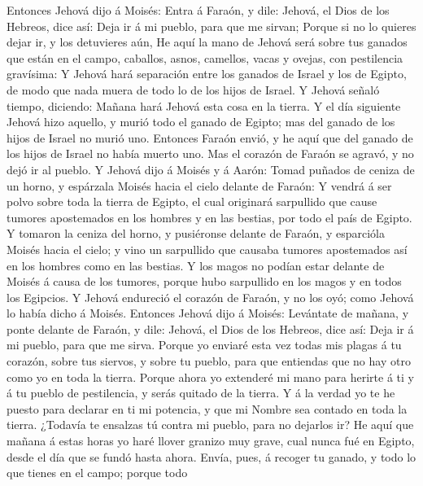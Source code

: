  Entonces Jehová dijo á Moisés: Entra á Faraón, y dile:
Jehová, el Dios de los Hebreos, dice así: Deja ir á mi pueblo, para que
me sirvan;  Porque si no lo quieres dejar ir, y los
detuvieres aún,  He aquí la mano de Jehová será sobre tus
ganados que están en el campo, caballos, asnos, camellos, vacas y
ovejas, con pestilencia gravísima:  Y Jehová hará
separación entre los ganados de Israel y los de Egipto, de modo que nada
muera de todo lo de los hijos de Israel.  Y Jehová señaló
tiempo, diciendo: Mañana hará Jehová esta cosa en la tierra.
 Y el día siguiente Jehová hizo aquello, y murió todo el
ganado de Egipto; mas del ganado de los hijos de Israel no murió uno.
 Entonces Faraón envió, y he aquí que del ganado de los
hijos de Israel no había muerto uno. Mas el corazón de Faraón se agravó,
y no dejó ir al pueblo.  Y Jehová dijo á Moisés y á Aarón:
Tomad puñados de ceniza de un horno, y espárzala Moisés hacia el cielo
delante de Faraón:  Y vendrá á ser polvo sobre toda la
tierra de Egipto, el cual originará sarpullido que cause tumores
apostemados en los hombres y en las bestias, por todo el país de Egipto.
 Y tomaron la ceniza del horno, y pusiéronse delante de
Faraón, y esparcióla Moisés hacia el cielo; y vino un sarpullido que
causaba tumores apostemados así en los hombres como en las bestias.
 Y los magos no podían estar delante de Moisés á causa de
los tumores, porque hubo sarpullido en los magos y en todos los
Egipcios.  Y Jehová endureció el corazón de Faraón, y no
los oyó; como Jehová lo había dicho á Moisés.  Entonces
Jehová dijo á Moisés: Levántate de mañana, y ponte delante de Faraón, y
dile: Jehová, el Dios de los Hebreos, dice así: Deja ir á mi pueblo,
para que me sirva.  Porque yo enviaré esta vez todas mis
plagas á tu corazón, sobre tus siervos, y sobre tu pueblo, para que
entiendas que no hay otro como yo en toda la tierra. 
Porque ahora yo extenderé mi mano para herirte á ti y á tu pueblo de
pestilencia, y serás quitado de la tierra.  Y á la verdad
yo te he puesto para declarar en ti mi potencia, y que mi Nombre sea
contado en toda la tierra.  ¿Todavía te ensalzas tú
contra mi pueblo, para no dejarlos ir?  He aquí que
mañana á estas horas yo haré llover granizo muy grave, cual nunca fué en
Egipto, desde el día que se fundó hasta ahora.  Envía,
pues, á recoger tu ganado, y todo lo que tienes en el campo; porque todo
